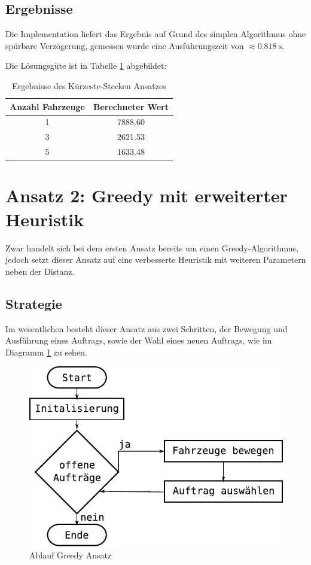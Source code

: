 \documentclass[ngerman]{tudscrreprt}
\begin{document}
\subsection{Ergebnisse}
Die Implementation liefert das Ergebnis auf Grund des simplen Algorithmus ohne spürbare
Verzögerung, gemessen wurde eine Ausführungszeit von $\approx \SI{0.818}{\second}$.

Die Lösungsgüte ist in Tabelle \ref{table:shortest-paths} abgebildet:

\begin{table}[H]
    \centering
    \begin{tabular}{|c|c|}
    \hline
    Anzahl Fahrzeuge & Berechneter Wert \\ \hline
    1                & \num{7888.60}    \\ \hline
    3                & \num{2621.53}    \\ \hline
    5                & \num{1633.48}    \\ \hline
    \end{tabular}
    \caption{Ergebnisse des Kürzeste-Stecken Ansatzes}
    \label{table:shortest-paths}
\end{table}


\section{Ansatz 2: Greedy mit erweiterter Heuristik}
Zwar handelt sich bei dem ersten Ansatz bereits um einen Greedy-Algorithmus,
jedoch setzt dieser Ansatz auf eine verbesserte Heuristik mit weiteren
Parametern neben der Distanz.

\subsection{Strategie}
Im wesentlichen besteht dieser Ansatz aus zwei Schritten, der Bewegung und Ausführung
eines Auftrags, sowie der Wahl eines neuen Auftrags, wie im Diagramm
\ref{figure:greedy-diagram} zu sehen.

\begin{figure}[H]
    \centering
    \includegraphics[scale=0.5]{src/greedy-diagram}
    \caption{Ablauf Greedy Ansatz}
    \label{figure:greedy-diagram}
\end{figure}
\end{document}

